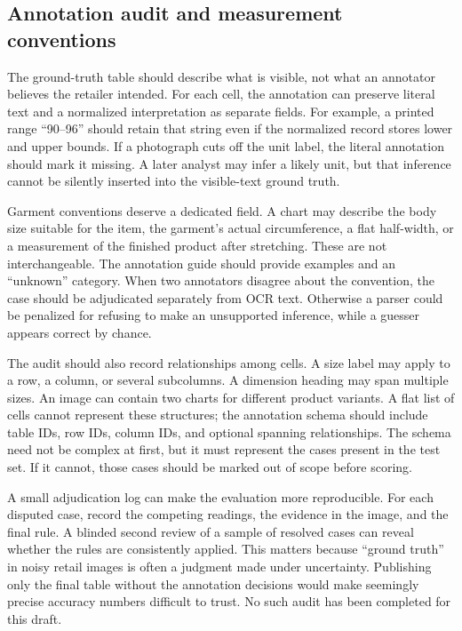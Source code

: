 \documentclass[10pt,letterpaper]{article}
\begin{document}
\subsection{Annotation audit and measurement conventions}

The ground-truth table should describe what is visible, not what an annotator believes the retailer intended. For each cell, the annotation can preserve literal text and a normalized interpretation as separate fields. For example, a printed range ``90--96'' should retain that string even if the normalized record stores lower and upper bounds. If a photograph cuts off the unit label, the literal annotation should mark it missing. A later analyst may infer a likely unit, but that inference cannot be silently inserted into the visible-text ground truth.

Garment conventions deserve a dedicated field. A chart may describe the body size suitable for the item, the garment's actual circumference, a flat half-width, or a measurement of the finished product after stretching. These are not interchangeable. The annotation guide should provide examples and an ``unknown'' category. When two annotators disagree about the convention, the case should be adjudicated separately from OCR text. Otherwise a parser could be penalized for refusing to make an unsupported inference, while a guesser appears correct by chance.

The audit should also record relationships among cells. A size label may apply to a row, a column, or several subcolumns. A dimension heading may span multiple sizes. An image can contain two charts for different product variants. A flat list of cells cannot represent these structures; the annotation schema should include table IDs, row IDs, column IDs, and optional spanning relationships. The schema need not be complex at first, but it must represent the cases present in the test set. If it cannot, those cases should be marked out of scope before scoring.

A small adjudication log can make the evaluation more reproducible. For each disputed case, record the competing readings, the evidence in the image, and the final rule. A blinded second review of a sample of resolved cases can reveal whether the rules are consistently applied. This matters because ``ground truth'' in noisy retail images is often a judgment made under uncertainty. Publishing only the final table without the annotation decisions would make seemingly precise accuracy numbers difficult to trust. No such audit has been completed for this draft.
\end{document}
